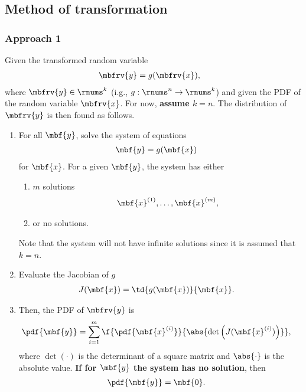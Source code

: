 \subsection{Method of transformation}
\subsubsection{Approach 1}
\label{sec: MV method of transformation approach 1}
\begin{myBlackBox}
    Given the transformed random variable    
    \begin{align}
        \mbfrv{y} &= g(\mbfrv{x}),
    \end{align}
    where $\mbfrv{y}\in\rnums^{k}$ (i.g., $g:\rnums^{n}\to\rnums^{k}$) and given the PDF of the random variable $\mbfrv{x}$. For now, \textbf{assume $k=n$}. The distribution of $\mbfrv{y}$ is then found as follows.
    \begin{enumerate}
        \item For all $\mbf{y}$, solve the system of equations
        \begin{align}
            \mbf{y} &= g(\mbf{x})
        \end{align}
        for $\mbf{x}$. For a given $\mbf{y}$, the system has either
        \begin{enumerate}
            \item $m$ solutions
            \begin{align}
                \mbf{x}^{(1)}, \ldots, \mbf{x}^{(m)},
            \end{align}
            \item or no solutions.
        \end{enumerate}
        Note that the system will not have infinite solutions since it is assumed that $k=n$.
        \item Evaluate the Jacobian of $g$
        \begin{align}
            J(\mbf{x})                         
            &= \td{g(\mbf{x})}{\mbf{x}}.
        \end{align}
        \item Then, the PDF of $\mbfrv{y}$ is
        \begin{align}
            \pdf{\mbf{y}} &= 
            \sum_{i=1}^{m} \f{\pdf{\mbf{x}^{(i)}}}{\abs{\operatorname{det}\left(J(\mbf{x}^{(i)})\right)}},
        \end{align}
        where $\operatorname{det}(\cdot)$ is the determinant of a square matrix and $\abs{\cdot}$ is the absolute value. \textbf{If for $\mbf{y}$ the system has no solution}, then 
        \begin{align}
            \pdf{\mbf{y}} &= \mbf{0}.
        \end{align}
    \end{enumerate}
\end{myBlackBox}
